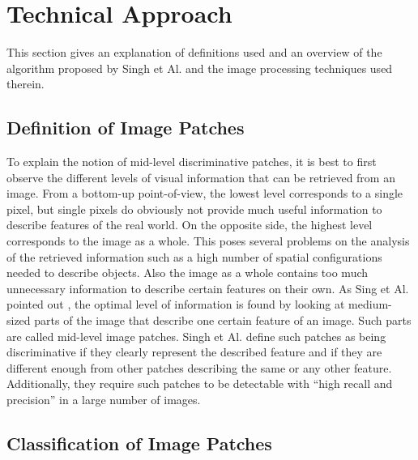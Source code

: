 
\section{Technical Approach}\label{sec:StateArt}

This section gives an explanation of definitions used and an overview of the algorithm proposed by Singh et Al. \cite{Singh2012DiscPat} and the image processing techniques used therein.

\subsection{Definition of Image Patches}

To explain the notion of mid-level discriminative patches, it is best to first observe the different levels of visual information that can be retrieved from an image. From a bottom-up point-of-view, the lowest level corresponds to a single pixel, but single pixels do obviously not provide much useful information to describe features of the real world. On the opposite side, the highest level corresponds to the image as a whole. This poses several problems on the analysis of the retrieved information such as a high number of spatial configurations needed to describe objects. Also the image as a whole contains too much unnecessary information to describe certain features on their own. As Sing et Al. pointed out \cite{Singh2012DiscPat}, the optimal level of information is found by looking at medium-sized parts of the image that describe one certain feature of an image. Such parts are called mid-level image patches. Singh et Al. \cite{Singh2012DiscPat} define such patches as being discriminative if they clearly represent the described feature and if they are different enough from other patches describing the same or any other feature. Additionally, they require such patches to be detectable with "`high recall and precision"' in a large number of images.

\subsection{Classification of Image Patches}

